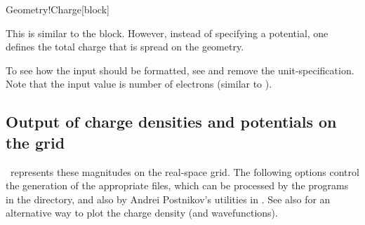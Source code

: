 \begin{fdfentry}{Geometry!Charge}[block]%

  This is similar to the  block. However,
  instead of specifying a potential, one defines the total charge that
  is spread on the geometry. 

  To see how the input should be formatted, see
   and remove the unit-specification. Note that
  the input value is number of electrons (similar to ).
  
\end{fdfentry}


\vspace{5pt}
\subsection{Output of charge densities and potentials on the grid}

\siesta\ represents these magnitudes on the real-space grid. The
following options control the generation of the appropriate files,
which can be processed by the programs in the 
directory, and also by Andrei Postnikov's utilities in
. See also  for
an alternative way to plot the charge density (and wavefunctions).

